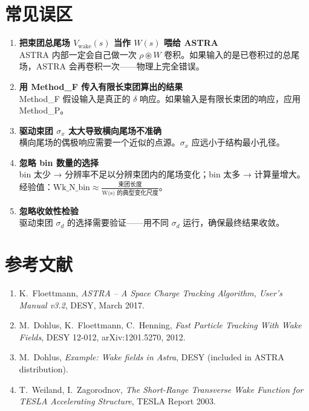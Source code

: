 \documentclass[a4paper,11pt]{article}
\begin{document}
\newpage
\section{常见误区}

\begin{enumerate}[leftmargin=*]

  \item \textbf{把束团总尾场 $V_{\text{wake}}(s)$ 当作 $W(s)$ 喂给 ASTRA} \\
        ASTRA 内部一定会自己做一次 $\rho \circledast W$ 卷积。如果输入的是已卷积过的总尾场，ASTRA 会再卷积一次——物理上完全错误。

  \item \textbf{用 Method\_F 传入有限长束团算出的结果} \\
        Method\_F 假设输入是真正的 $\delta$ 响应。如果输入是有限长束团的响应，应用 Method\_P。

  \item \textbf{驱动束团 $\sigma_x$ 太大导致横向尾场不准确} \\
        横向尾场的偶极响应需要一个近似的点源。$\sigma_x$ 应远小于结构最小孔径。

  \item \textbf{忽略 bin 数量的选择} \\
        bin 太少 → 分辨率不足以分辨束团内的尾场变化；bin 太多 → 计算量增大。经验值：$\text{Wk\_N\_bin} \approx \frac{\text{束团长度}}{\text{W(s) 的典型变化尺度}}$。

  \item \textbf{忽略收敛性检验} \\
        驱动束团 $\sigma_d$ 的选择需要验证——用不同 $\sigma_d$ 运行，确保最终结果收敛。

\end{enumerate}

\section*{参考文献}

\begin{enumerate}
  \item K.~Floettmann, \textit{ASTRA -- A Space Charge Tracking Algorithm, User's Manual v3.2}, DESY, March 2017.
  \item M.~Dohlus, K.~Floettmann, C.~Henning, \textit{Fast Particle Tracking With Wake Fields}, DESY 12-012, arXiv:1201.5270, 2012.
  \item M.~Dohlus, \textit{Example: Wake fields in Astra}, DESY (included in ASTRA distribution).
  \item T.~Weiland, I.~Zagorodnov, \textit{The Short-Range Transverse Wake Function for TESLA Accelerating Structure}, TESLA Report 2003.
\end{enumerate}
\end{document}
